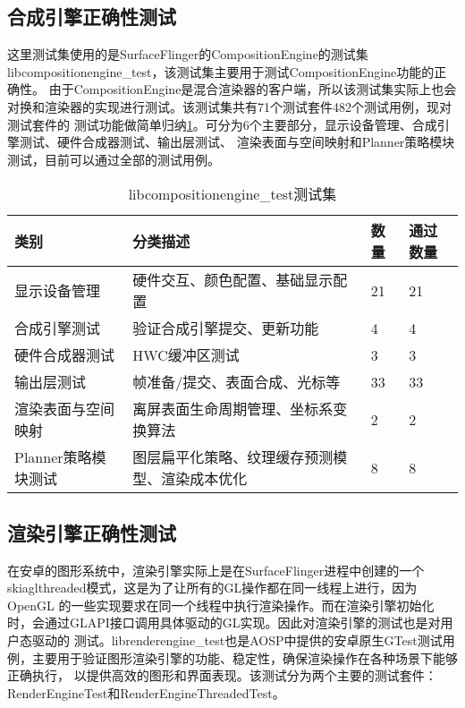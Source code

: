 \subsection{合成引擎正确性测试}
\label{sec:合成引擎正确性测试}
这里测试集使用的是SurfaceFlinger的CompositionEngine的测试集libcompositionengine\_test，该测试集主要用于测试CompositionEngine功能的正确性。
由于CompositionEngine是混合渲染器的客户端，所以该测试集实际上也会对换和渲染器的实现进行测试。该测试集共有71个测试套件482个测试用例，现对测试套件的
测试功能做简单归纳\ref{tab:libcompositionengine_test测试集}。可分为6个主要部分，显示设备管理、合成引擎测试、硬件合成器测试、输出层测试、
渲染表面与空间映射和Planner策略模块测试，目前可以通过全部的测试用例。

\begin{table}[H]
    \centering
    \caption{libcompositionengine\_test测试集}
    \label{tab:libcompositionengine_test测试集}
    \begin{tabular}{llll}
      \toprule
      类别 &  分类描述 & 数量 & 通过数量\\
      \midrule
      显示设备管理 & 硬件交互、颜色配置、基础显示配置 & 21 & 21\\
      合成引擎测试 & 验证合成引擎提交、更新功能 & 4 & 4\\
      硬件合成器测试 & HWC缓冲区测试 & 3 & 3\\
      输出层测试 & 帧准备/提交、表面合成、光标等  & 33 & 33\\
      渲染表面与空间映射 & 	离屏表面生命周期管理、坐标系变换算法 & 2 & 2\\
      Planner策略模块测试 & 图层扁平化策略、纹理缓存预测模型、渲染成本优化 & 8 & 8\\
      \bottomrule
    \end{tabular}
    \note{}
\end{table}


\subsection{渲染引擎正确性测试}
\label{sec:渲染引擎正确性测试}
在安卓的图形系统中，渲染引擎实际上是在SurfaceFlinger进程中创建的一个skiaglthreaded模式，这是为了让所有的GL操作都在同一线程上进行，因为
OpenGL 的一些实现要求在同一个线程中执行渲染操作。而在渲染引擎初始化时，会通过GLAPI接口调用具体驱动的GL实现。因此对渲染引擎的测试也是对用户态驱动的
测试。librenderengine\_test也是AOSP中提供的安卓原生GTest测试用例，主要用于验证图形渲染引擎的功能、稳定性，确保渲染操作在各种场景下能够正确执行，
以提供高效的图形和界面表现。该测试分为两个主要的测试套件：RenderEngineTest和RenderEngineThreadedTest。


